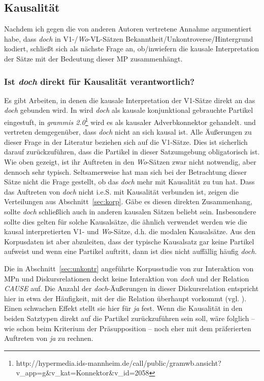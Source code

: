 {\subsection{Kausalität}
Nachdem ich gegen die von anderen Autoren vertretene Annahme argumentiert habe, dass \textit{doch} in V1-/\textit{Wo}-VL-Sätzen Bekanntheit/Unkontroverse/Hintergrund kodiert, schließt sich als nächste Frage an, ob/inwiefern die kausale Interpretation der Sätze mit der Bedeutung dieser MP zusammenhängt. 

\subsubsection{Ist \textit{doch} direkt für Kausalität verantwortlich?}	
Es gibt Arbeiten, in denen die kausale Interpretation der V1-Sätze direkt an das \textit{doch} gebunden wird. In \citet[59]{Koenig1990} wird \textit{doch} als \glqq kausale konjunktional gebrauchte Partikel\grqq{} eingestuft, in \textit{grammis 2.0}\footnote{http://hypermedia.ids-mannheim.de/call/public/gramwb.ansicht?v\_app=g\&v\_kat=Konnek\-tor\&v\_id=2058} wird es als kausa\-ler Adverbkonnektor gehandelt. \citet[168]{Oennerfors1997} und \citet[170]{Pittner2011} vertre\-ten demgegenüber, dass \textit{doch} nicht an sich kausal ist. Alle Äußerungen zu dieser Frage in der Literatur beziehen sich auf die V1-Sätze. Dies ist sicherlich darauf zurückzuführen, dass die Partikel in dieser Satzumgebung obligatorisch ist. Wie oben gezeigt, ist ihr Auftreten in den \textit{Wo}-Sätzen zwar nicht notwendig, aber dennoch sehr typisch. Seltsamerweise hat man sich bei der Betrachtung dieser Sätze nicht die Frage gestellt, ob das \textit{doch} mehr mit Kausalität zu tun hat. Dass das Auftreten von \textit{doch} nicht i.e.S. mit Kausalität verbunden ist, zeigen die Verteilungen aus Abschnitt~\ref{sec:korp}. Gäbe es diesen direkten Zusammenhang, sollte \textit{doch} schließlich auch in anderen kausalen Sätzen beliebt sein. Insbesondere sollte dies gelten für solche Kausalsätze, die ähnlich verwendet werden wie die kausal interpretierten V1- und \textit{Wo}-Sätze, d.h. die  modalen Kausalsätze. Aus den Korpusdaten ist aber abzuleiten, dass der typische Kausalsatz gar keine Partikel aufweist und wenn eine Partikel auftritt, dann ist dies nicht auffällig häufig \textit{doch}. 

Die in Abschnitt~\ref{sec:unkontr} angeführte Korpusstudie von \citet{Doering2014} zur Interaktion von MPn und Diskursrelationen deckt keine Interaktion von \textit{doch} und der Relation \textit{CAUSE} auf. Die Anzahl der \textit{doch}-Äußerungen in dieser Diskursrelation entspricht hier in etwa der Häufigkeit, mit der die Relation überhaupt vorkommt (vgl. \citeyear[88]{Doering2014}). Einen schwachen Effekt stellt sie hier für \textit{ja} fest. Wenn die Kausali\-tät in den beiden Satztypen direkt auf die Partikel zurückzuführen sein soll, wäre folglich – wie schon beim Kriterium der Präsupposition – noch eher mit dem präferierten Auftreten von \textit{ja} zu rechnen. 

}
